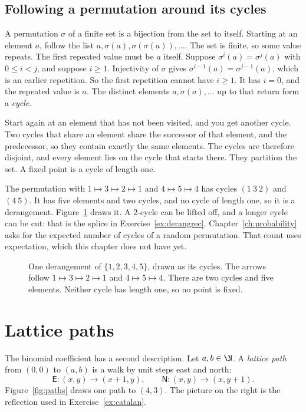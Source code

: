 \subsection*{Following a permutation around its cycles}
A permutation $\sigma$ of a finite set is a bijection from the set to itself. Starting at an element $a$, follow the list $a,\sigma(a),\sigma(\sigma(a)),\dots$. The set is finite, so some value repeats. The first repeated value must be $a$ itself. Suppose $\sigma^i(a)=\sigma^j(a)$ with $0\le i<j$, and suppose $i\ge 1$. Injectivity of $\sigma$ gives $\sigma^{i-1}(a)=\sigma^{j-1}(a)$, which is an earlier repetition. So the first repetition cannot have $i\ge 1$. It has $i=0$, and the repeated value is $a$. The distinct elements $a,\sigma(a),\dots$ up to that return form a \emph{cycle}.

Start again at an element that has not been visited, and you get another cycle. Two cycles that share an element share the successor of that element, and the predecessor, so they contain exactly the same elements. The cycles are therefore disjoint, and every element lies on the cycle that starts there. They partition the set. A fixed point is a cycle of length one.

The permutation with $1\mapsto 3\mapsto 2\mapsto 1$ and $4\mapsto 5\mapsto 4$ has cycles $(1\ 3\ 2)$ and $(4\ 5)$. It has five elements and two cycles, and no cycle of length one, so it is a derangement. Figure~\ref{fig:cycles} draws it. A $2$-cycle can be lifted off, and a longer cycle can be cut: that is the splice in Exercise~\ref{ex:derangrec}. Chapter~\ref{ch:probability} asks for the expected number of cycles of a random permutation. That count uses expectation, which this chapter does not have yet.

\begin{figure}[ht]
\centering
{}
\caption{One derangement of $\{1,2,3,4,5\}$, drawn as its cycles. The arrows follow $1\mapsto 3\mapsto 2\mapsto 1$ and $4\mapsto 5\mapsto 4$. There are two cycles and five elements. Neither cycle has length one, so no point is fixed.}
\label{fig:cycles}
\end{figure}

\section{Lattice paths}

The binomial coefficient has a second description. Let $a,b\in\N$. A \emph{lattice path} from $(0,0)$ to $(a,b)$ is a walk by unit steps east and north:
\[
\mathsf E\colon (x,y)\to(x+1,y),\qquad \mathsf N\colon (x,y)\to(x,y+1).
\]
Figure~\ref{fig:paths} draws one path to $(4,3)$. The picture on the right is the reflection used in Exercise~\ref{ex:catalan}.

